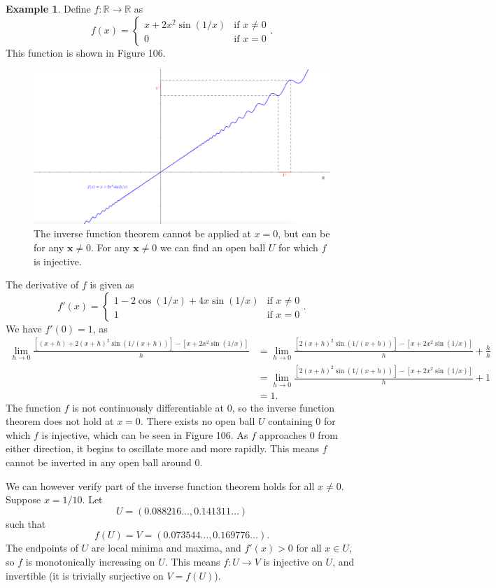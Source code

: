 \documentclass{article}
\newcommand{\R}{\mathbb{R}}
\newcommand{\x}{\mathbf{x}}
\theoremstyle{definition}
\newtheorem{example}{Example}[section]
\begin{document}
	\begin{example}
		Define $ f:\R\to\R $ as $$ f(x)=\begin{cases}
			x+2x^2\sin(1/x)&\text{if } x\neq 0\\
			0&\text{if }x=0
		\end{cases}.$$
		This function is shown in Figure 106. 
		\begin{figure}[h!]
			\centering
			\includegraphics[width=0.9\linewidth]{figures/ivt_ex1}
			\caption{The inverse function theorem cannot be applied at $ x=0 $, but can be for any $ \x \neq 0 $. For any $ \x\neq 0 $ we can find an open ball $ U $ for which $ f $ is injective. }
			\label{fig:ivtex1}
		\end{figure}
		
		The derivative of $ f $ is given as 
		$$ f'(x)=\begin{cases}
			1-2\cos(1/x) + 4x\sin(1/x)&\text{if } x\neq 0\\
			1&\text{if }x=0
		\end{cases}.$$
		We have $ f'(0)=1 $, as 
		\begin{align*}
			\lim_{h\to0}\frac{[(x+h)+2(x+h)^2\sin(1/(x+h))]-[x+2x^2\sin(1/x)]}{h} & = 	\lim_{h\to0}\frac{[2(x+h)^2\sin(1/(x+h))]-[x+2x^2\sin(1/x)]}{h} + \frac{h}{h} \\ & = \lim_{h\to0}\frac{[2(x+h)^2\sin(1/(x+h))]-[x+2x^2\sin(1/x)]}{h} + 1 \\ & = 1.
		\end{align*}
		The function $ f $ is not continuously differentiable at $ 0 $, so the inverse function theorem does not hold at $ x=0 $. There exists no open ball $ U $ containing $ 0 $ for which $ f $ is injective, which can be seen in Figure 106. As $ f $ approaches $ 0 $ from either direction, it begins to oscillate more and more rapidly. This means $ f $ cannot be inverted in any open ball around $ 0 $.  
		
		We can however verify part of the inverse function theorem holds for all $ x\neq 0 $. Suppose $ x = 1/10 $. Let $$ U = (0.088216\ldots , 0.141311\ldots) $$ such that $$ f(U)= V = (0.073544\ldots,0.169776\ldots).$$ The endpoints of $ U $ are local minima and maxima, and $ f'(x) > 0 $ for all $ x\in U $, so $ f $ is monotonically increasing on $ U $. This means $ f:U\to V $ is injective on $ U $, and invertible (it is trivially surjective on $ V=f(U) $).      
	\end{example}
\end{document}
